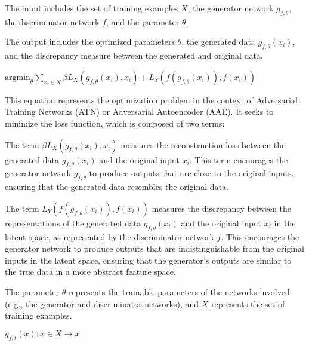 The input includes the set of training examples $X$, the generator network $g_{f,\theta}$, the discriminator network $f$, and the parameter $\theta$.

The output includes the optimized parameters $\theta$, the generated data $g_{f,\theta}(x_i)$, and the discrepancy measure between the generated and original data.

$\text{argmin}_{\theta} \sum_{x_i \in X} \beta L_X(g_{f,\theta}(x_i), x_i) + L_Y(f(g_{f,\theta}(x_i)), f(x_i))$


This equation represents the optimization problem in the context of Adversarial Training Networks (ATN) or Adversarial Autoencoder (AAE). It seeks to minimize the loss function, which is composed of two terms:

The term $\beta L_X(g_{f,\theta}(x_i), x_i)$ measures the reconstruction loss between the generated data $g_{f,\theta}(x_i)$ and the original input $x_i$. This term encourages the generator network $g_{f,\theta}$ to produce outputs that are close to the original inputs, ensuring that the generated data resembles the original data.

The term $L_Y(f(g_{f,\theta}(x_i)), f(x_i))$ measures the discrepancy between the representations of the generated data $g_{f,\theta}(x_i)$ and the original input $x_i$ in the latent space, as represented by the discriminator network $f$. This encourages the generator network to produce outputs that are indistinguishable from the original inputs in the latent space, ensuring that the generator's outputs are similar to the true data in a more abstract feature space.

The parameter $\theta$ represents the trainable parameters of the networks involved (e.g., the generator and discriminator networks), and $X$ represents the set of training examples.

$g_{f,t}(x) : x \in X \rightarrow x$